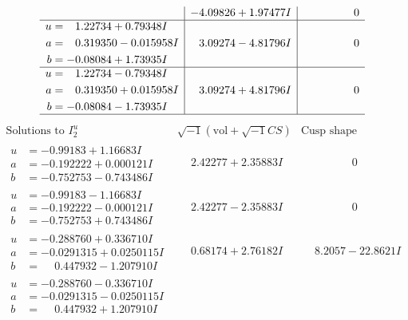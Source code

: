 \documentclass[1p]{elsarticle_modified}
\theoremstyle{definition}
\newcommand{\I}{\sqrt{-1}}
\begin{document}
$$\begin{array}{c|c|c}
 & -4.09826 + 1.97477 I & \phantom{-0.000000 } 0 \\ \hline\begin{aligned}
u &= \phantom{-}1.22734 + 0.79348 I \\
a &= \phantom{-}0.319350 - 0.015958 I \\
b &= -0.08084 + 1.73935 I\end{aligned}
 & \phantom{-}3.09274 - 4.81796 I & \phantom{-0.000000 } 0 \\ \hline\begin{aligned}
u &= \phantom{-}1.22734 - 0.79348 I \\
a &= \phantom{-}0.319350 + 0.015958 I \\
b &= -0.08084 - 1.73935 I\end{aligned}
 & \phantom{-}3.09274 + 4.81796 I & \phantom{-0.000000 } 0\\
 \hline 
 \end{array}$$\newpage$$\begin{array}{c|c|c}  
\text{Solutions to }I^u_{2}& \I (\text{vol} + \sqrt{-1}CS) & \text{Cusp shape}\\
 \hline 
\begin{aligned}
u &= -0.99183 + 1.16683 I \\
a &= -0.192222 + 0.000121 I \\
b &= -0.752753 - 0.743486 I\end{aligned}
 & \phantom{-}2.42277 + 2.35883 I & \phantom{-0.000000 } 0 \\ \hline\begin{aligned}
u &= -0.99183 - 1.16683 I \\
a &= -0.192222 - 0.000121 I \\
b &= -0.752753 + 0.743486 I\end{aligned}
 & \phantom{-}2.42277 - 2.35883 I & \phantom{-0.000000 } 0 \\ \hline\begin{aligned}
u &= -0.288760 + 0.336710 I \\
a &= -0.0291315 + 0.0250115 I \\
b &= \phantom{-}0.447932 - 1.207910 I\end{aligned}
 & \phantom{-}0.68174 + 2.76182 I & \phantom{-}8.2057 - 22.8621 I \\ \hline\begin{aligned}
u &= -0.288760 - 0.336710 I \\
a &= -0.0291315 - 0.0250115 I \\
b &= \phantom{-}0.447932 + 1.207910 I\end{aligned}

\end{array}$$
\end{document}
